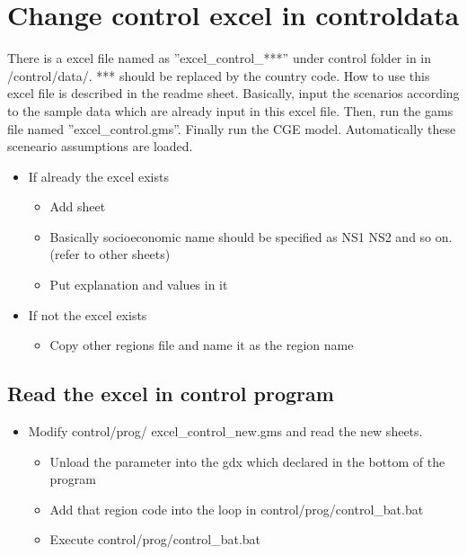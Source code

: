 \documentclass[10pt,a4paper,titlepage,dvipdfmx]{book}
\begin{document}
\chapter{\label{chp:ChaConExc}Change control excel in \/control\/data\/}

    There is a excel file named as ''excel\_control\_***'' under control folder in in /control/data/. *** should be replaced by the country code. How to use this excel file is described in the readme sheet. Basically, input the scenarios according to the sample data which are already input in this excel file. Then, run the gams file named ''excel\_control.gms''. Finally run the CGE model.  Automatically these sceneario assumptions are loaded.
\begin{itemize}
\item If already the excel exists
\begin{itemize}
\item Add sheet
\item Basically socioeconomic name should be specified as NS1 NS2 and so on. (refer to other sheets)
\item Put explanation and values in it
\end{itemize}

\item If not the excel exists
\begin{itemize}
\item Copy other regions file and name it as the region name
\end{itemize}

\end{itemize}
\section{\label{sec:ReaExcConPro}Read the excel in control program}


\begin{itemize}
\item Modify control/prog/ excel\_control\_new.gms and read the new sheets.
\begin{itemize}
\item Unload the parameter into the gdx which declared in the bottom of the program
\item Add that region code into the loop in control/prog/control\_bat.bat
\item Execute control/prog/control\_bat.bat 
\end{itemize}

\end{itemize}
\end{document}
